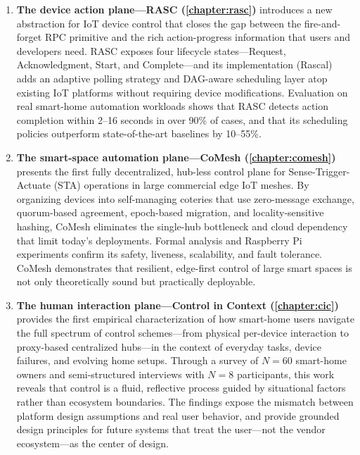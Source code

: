 \begin{enumerate}

    \item \textbf{The device action plane---RASC (\ref{chapter:rasc})} introduces a new abstraction for IoT device control that closes the gap between the fire-and-forget RPC primitive and the rich action-progress information that users and developers need. RASC exposes four lifecycle states---Request, Acknowledgment, Start, and Complete---and its implementation (Rascal) adds an adaptive polling strategy and DAG-aware scheduling layer atop existing IoT platforms without requiring device modifications. Evaluation on real smart-home automation workloads shows that RASC detects action completion within 2--16 seconds in over 90\% of cases, and that its scheduling policies outperform state-of-the-art baselines by 10--55\%.

    \item \textbf{The smart-space automation plane---CoMesh (\ref{chapter:comesh})} presents the first fully decentralized, hub-less control plane for Sense-Trigger-Actuate (STA) operations in large commercial edge IoT meshes. By organizing devices into self-managing coteries that use zero-message exchange, quorum-based agreement, epoch-based migration, and locality-sensitive hashing, CoMesh eliminates the single-hub bottleneck and cloud dependency that limit today's deployments. Formal analysis and Raspberry Pi experiments confirm its safety, liveness, scalability, and fault tolerance. CoMesh demonstrates that resilient, edge-first control of large smart spaces is not only theoretically sound but practically deployable.

    \item \textbf{The human interaction plane---Control in Context (\ref{chapter:cic})} provides the first empirical characterization of how smart-home users navigate the full spectrum of control schemes---from physical per-device interaction to proxy-based centralized hubs---in the context of everyday tasks, device failures, and evolving home setups. Through a survey of $N=60$ smart-home owners and semi-structured interviews with $N=8$ participants, this work reveals that control is a fluid, reflective process guided by situational factors rather than ecosystem boundaries. The findings expose the mismatch between platform design assumptions and real user behavior, and provide grounded design principles for future systems that treat the user---not the vendor ecosystem---as the center of design.

\end{enumerate}

